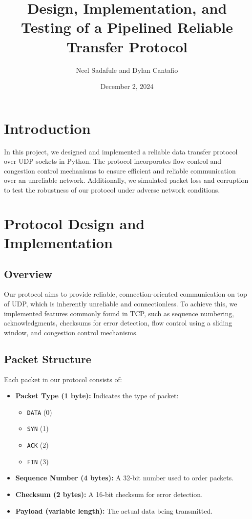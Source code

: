 \documentclass[11pt]{article}
\title{Design, Implementation, and Testing of a Pipelined Reliable Transfer Protocol}
\author{Neel Sadafule and Dylan Cantafio}
\date{December 2, 2024}
\begin{document}
\maketitle

\section{Introduction}

In this project, we designed and implemented a reliable data transfer protocol over UDP sockets in Python. The protocol incorporates flow control and congestion control mechanisms to ensure efficient and reliable communication over an unreliable network. Additionally, we simulated packet loss and corruption to test the robustness of our protocol under adverse network conditions.

\section{Protocol Design and Implementation}

\subsection{Overview}

Our protocol aims to provide reliable, connection-oriented communication on top of UDP, which is inherently unreliable and connectionless. To achieve this, we implemented features commonly found in TCP, such as sequence numbering, acknowledgments, checksums for error detection, flow control using a sliding window, and congestion control mechanisms.

\subsection{Packet Structure}

Each packet in our protocol consists of:

\begin{itemize}
    \item \textbf{Packet Type (1 byte):} Indicates the type of packet:
    \begin{itemize}
        \item \texttt{DATA} (0)
        \item \texttt{SYN} (1)
        \item \texttt{ACK} (2)
        \item \texttt{FIN} (3)
    \end{itemize}
    \item \textbf{Sequence Number (4 bytes):} A 32-bit number used to order packets.
    \item \textbf{Checksum (2 bytes):} A 16-bit checksum for error detection.
    \item \textbf{Payload (variable length):} The actual data being transmitted.
\end{itemize}
\end{document}
